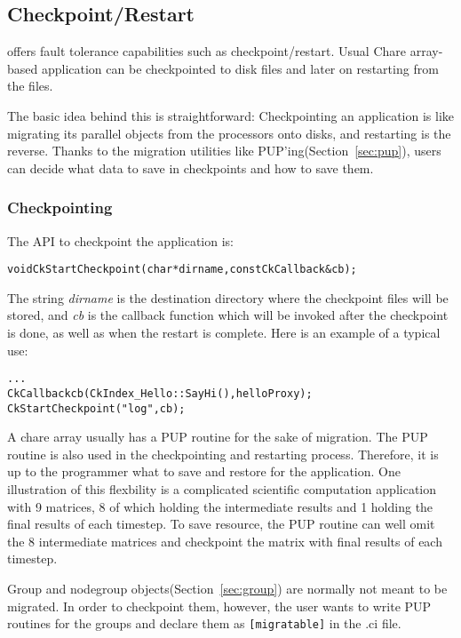 \subsection{Checkpoint/Restart}
\label{sec:checkpoint}

\charmpp{} offers fault tolerance capabilities such as 
checkpoint/restart. Usual Chare array-based \charmpp{} application 
can be checkpointed to disk files and later on restarting from the files.

The basic idea behind this is straightforward: Checkpointing an 
application is like migrating its parallel objects from the processors
onto disks, and restarting is the reverse. Thanks to the migration 
utilities like PUP'ing(Section~\ref{sec:pup}), users can decide what 
data to save in checkpoints and how to save them.

\subsubsection{Checkpointing}
	The API to checkpoint the application is:

\begin{alltt} 
  void CkStartCheckpoint(char* dirname,const CkCallback& cb);
\end{alltt}

The string {\it dirname} is the destination directory where the checkpoint
files will be stored, and {\it cb} is the callback function which will be
invoked after the checkpoint is done, as well as when the restart is
complete. Here is an example of a typical use:

\begin{alltt} 
  . . .
  CkCallback cb(CkIndex_Hello::SayHi(),helloProxy);
  CkStartCheckpoint("log",cb);
\end{alltt}

A chare array usually has a PUP routine for the sake of migration. 
The PUP routine is also used in the checkpointing and restarting process.
Therefore, it is up to the programmer what to save and restore for
the application. One illustration of this flexbility is a complicated
scientific computation application with 9 matrices, 8 of which holding 
the intermediate results and 1 holding the final results of each timestep.
To save resource, the PUP routine can well omit the 8 intermediate matrices
and checkpoint the matrix with final results of each timestep. 

Group and nodegroup objects(Section~\ref{sec:group}) are normally not 
meant to be migrated. In order to checkpoint them, however, the user 
wants to write PUP routines for the groups and declare them as 
{\tt [migratable]} in the .ci file.

